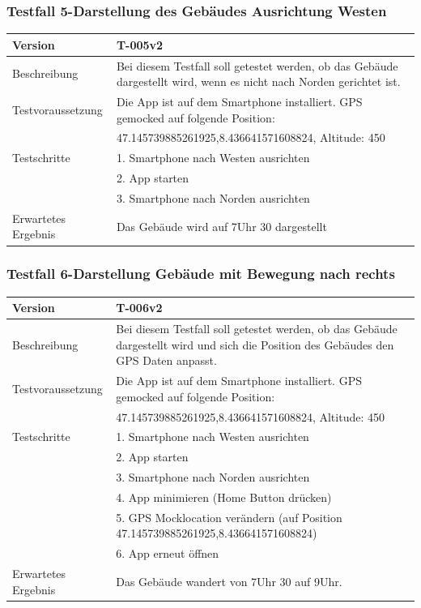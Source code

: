\documentclass[a4paper]{scrreprt}
\begin{document}
\subsubsection{Testfall 5-Darstellung des Gebäudes Ausrichtung Westen}
\begin{tabularx}{\textwidth}{|l|X|}
\hline
	Version &

	T-005v2 \\ 
\hline 
	Beschreibung & 
	Bei diesem Testfall soll getestet werden, ob das Gebäude dargestellt wird, wenn es nicht nach Norden gerichtet ist. \\ 
\hline 
	Testvoraussetzung &
	Die App ist auf dem Smartphone installiert. GPS gemocked auf folgende Position: \\ &
		47.145739885261925,8.436641571608824, Altitude: 450 \\ 
\hline 
	Testschritte & 
		1. Smartphone nach Westen ausrichten\\ &
		2. App starten\\ &
		3. Smartphone nach Norden ausrichten\\
\hline
	Erwartetes Ergebnis &
	Das Gebäude wird auf 7Uhr 30 dargestellt\\ 
\hline 
\end{tabularx}
\subsubsection{Testfall 6-Darstellung Gebäude mit Bewegung nach rechts}
\begin{tabularx}{\textwidth}{|l|X|}
\hline
	Version &
	T-006v2 \\
\hline
	Beschreibung &
	Bei diesem Testfall soll getestet werden, ob das Gebäude dargestellt wird und sich die Position des Gebäudes den GPS Daten anpasst. \\
\hline
	Testvoraussetzung &
	Die App ist auf dem Smartphone installiert. GPS gemocked auf folgende Position: \\ &
		47.145739885261925,8.436641571608824, Altitude: 450 \\ 
\hline 
	Testschritte & 
		1. Smartphone nach Westen ausrichten\\ &
		2. App starten\\ &
		3. Smartphone nach Norden ausrichten\\ &
		4. App minimieren (Home Button drücken)\\ &
		5. GPS Mocklocation verändern (auf Position 47.145739885261925,8.436641571608824)\\ &
		6. App erneut öffnen\\
\hline
	Erwartetes Ergebnis &
	Das Gebäude wandert von 7Uhr 30 auf 9Uhr.\\ 
\hline
\end{tabularx}
\end{document}
